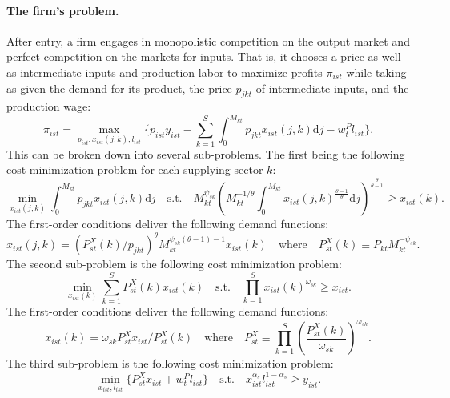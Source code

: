 \documentclass[12pt]{article}
\begin{document}
\paragraph{The firm's problem.} After entry, a firm engages in monopolistic competition on the output market and perfect competition on the markets for inputs. That is, it chooses a price as well as intermediate inputs and production labor to maximize profits $\pi_{ist}$ while taking as given the demand for its product, the price $p_{jkt}$ of intermediate inputs, and the production wage:
\begin{equation*}
    \pi_{ist} = \max_{p_{ist}, x_{ist}(j, k), l_{ist}}\{p_{ist} y_{ist} - \sum_{k = 1}^S \int_0^{M_{kt}} p_{jkt} x_{ist}(j, k) \text{d}j - w_t^P l_{ist}\}.
\end{equation*}
This can be broken down into several sub-problems. The first being the following cost minimization problem for each supplying sector $k$:
\begin{equation*}
    \min_{x_{ist}(j, k)} \int_0^{M_{kt}} p_{jkt} x_{ist}(j, k) \text{d}j \quad \text{s.t.} \quad M_{kt}^{\psi_{sk}} \left(M_{kt}^{-1 / \theta} \int_0^{M_{kt}} x_{ist}(j, k)^{\frac{\theta - 1}{\theta}} \text{d}j\right)^{\frac{\theta}{\theta - 1}} \geq x_{ist}(k).
\end{equation*}
The first-order conditions deliver the following demand functions:
\begin{equation*}
    x_{ist}(j, k) = (P_{st}^X(k) / p_{jkt})^{\theta} M_{kt}^{\psi_{sk} (\theta - 1) - 1} x_{ist}(k) \quad \text{where} \quad P_{st}^X(k) \equiv P_{kt} M_{kt}^{-\psi_{sk}}.
\end{equation*}
The second sub-problem is the following cost minimization problem:
\begin{equation*}
    \min_{x_{ist}(k)} \sum_{k = 1}^S P_{st}^X(k) x_{ist}(k) \quad \text{s.t.} \quad \prod_{k = 1}^S x_{ist}(k)^{\omega_{sk}} \geq x_{ist}.
\end{equation*}
The first-order conditions deliver the following demand functions:
\begin{equation*}
    x_{ist}(k) = \omega_{sk} P_{st}^X x_{ist} / P_{st}^X(k) \quad \text{where} \quad P_{st}^X \equiv \prod_{k = 1}^S \left(\frac{P_{st}^X(k)}{\omega_{sk}}\right)^{\omega_{sk}}.
\end{equation*}
The third sub-problem is the following cost minimization problem:
\begin{equation*}
    \min_{x_{ist}, l_{ist}}\{P_{st}^X x_{ist} + w_t^P l_{ist}\} \quad \text{s.t.} \quad x_{ist}^{\alpha_s} l_{ist}^{1 - \alpha_s} \geq y_{ist}.
\end{equation*}
\end{document}
